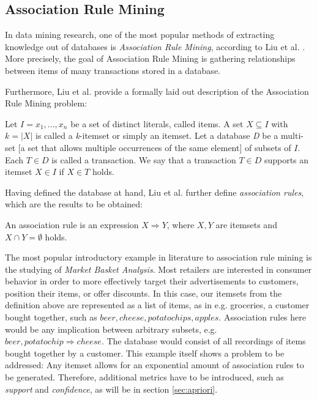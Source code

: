 \documentclass[bachelor,english]{info1thesis}
\begin{document}
\subsection{Association Rule Mining}
\label{sec:associationrulemining}

In data mining research, one of the most popular methods of extracting knowledge out of databases is \textit{Association Rule Mining}, according to Liu et al. \cite{liu1998integrating}. More precisely, the goal of Association Rule Mining is gathering relationships between items of many transactions stored in a database.

Furthermore, Liu et al. provide a formally laid out description of the Association Rule Mining problem:\newline

\begin{definition}
Let $I = {x_1, ..., x_n}$ be a set of distinct literals, called items. A set $X \subseteq I$ with $k = |X|$ is called a \textit{k}-itemset or simply an itemset. Let a database \textit{D} be a multi-set [a set that allows multiple occurrences of the same element] of subsets of $I$. Each $T \in D$ is called a transaction. We say that a transaction $T \in D$ supports an itemset $X \in I$ if $X \in T$ holds.\newline
\end{definition}


Having defined the database at hand, Liu et al. further define \textit{association rules}, which are the results to be obtained:\newline



\begin{definition}
An association rule is an expression $X \Rightarrow Y$, where $X, Y$ are itemsets and $X \cap Y = \emptyset$ holds.\newline
\end{definition}



The most popular introductory example in literature to association rule mining is the studying of \textit{Market Basket Analysis}. Most retailers are interested in consumer behavior in order to more effectively target their advertisements to customers, position their items, or offer discounts. In this case, our itemsets from the definition above are represented as a list of items, as in e.g. groceries, a customer bought together, such as ${beer, cheese, potato chips, apples}$. Association rules here would be any implication between arbitrary subsets, e.g. ${beer, potato chip} \Rightarrow {cheese}$. The database would consist of all recordings of items bought together by a customer.\newline
This example itself shows a problem to be addressed: Any itemset allows for an exponential amount of association rules to be generated. Therefore, additional metrics have to be introduced, such as \textit{support} and \textit{confidence}, as will be in section \ref{sec:apriori}.
\end{document}
